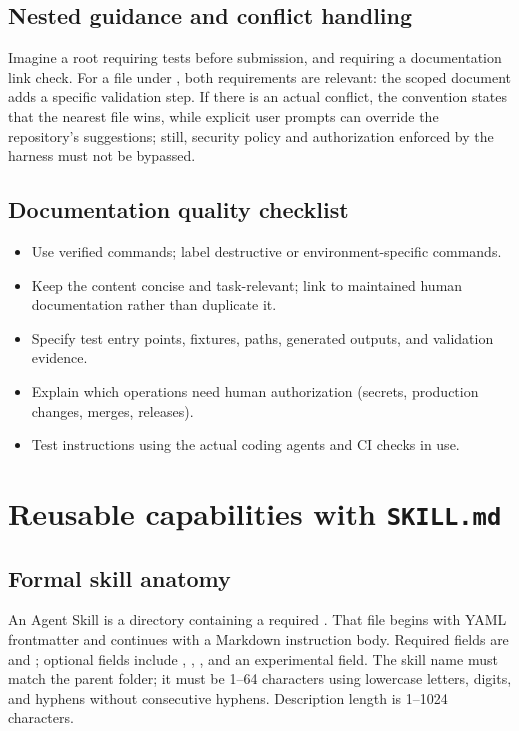 \documentclass[11pt,letterpaper]{article}
\begin{document}
\subsection{Nested guidance and conflict handling}
Imagine a root  requiring tests before submission, and  requiring a documentation link check. For a file under , both requirements are relevant: the scoped document adds a specific validation step. If there is an actual conflict, the convention states that the nearest file wins, while explicit user prompts can override the repository's suggestions; still, security policy and authorization enforced by the harness must not be bypassed.\cite{agentsmd}

\subsection{Documentation quality checklist}
\begin{itemize}
\item Use verified commands; label destructive or environment-specific commands.
\item Keep the content concise and task-relevant; link to maintained human documentation rather than duplicate it.
\item Specify test entry points, fixtures, paths, generated outputs, and validation evidence.
\item Explain which operations need human authorization (secrets, production changes, merges, releases).
\item Test instructions using the actual coding agents and CI checks in use.
\end{itemize}

\section{Reusable capabilities with \texttt{SKILL.md}}\label{sec:skills}
\subsection{Formal skill anatomy}
An Agent Skill is a directory containing a required . That file begins with YAML frontmatter and continues with a Markdown instruction body. Required fields are  and ; optional fields include , , , and an experimental  field. The skill name must match the parent folder; it must be 1--64 characters using lowercase letters, digits, and hyphens without consecutive hyphens. Description length is 1--1024 characters.\cite{agentskills}
\end{document}
